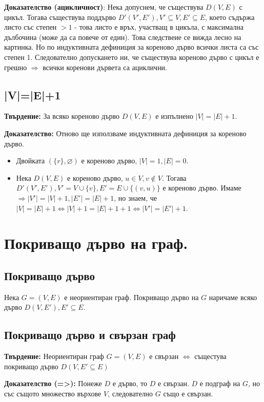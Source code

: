 \documentclass[fleqn,12pt]{article}
\begin{document}
\begin{flushleft}
\textbf{Доказателство (ацикличност)}: Нека допуснем, че съществува $D(V,E)$ с цикъл. Тогава съществува поддърво $D'(V', E'), V' \subseteq V, E' \subseteq E$, 
което съдържа листо със степен $>1$ - това листо е връх, участващ в цикъла, с максимална дълбочина (може да са повече от един). Това следствеие се вижда лесно на картинка. 
Но по индуктивната дефиниция за кореново дърво всички листа са със степен 1. Следователно допускането ни, че съществува кореново дърво с цикъл е грешно $\Rightarrow$ всички коренови дървета
са ациклични.
\vspace{10mm}

\subsection{|V|=|E|+1}
\textbf{Твърдение:} За всяко кореново дърво $D(V,E)$ е изпълнено $|V| = |E| + 1$.

\textbf{Доказателство:} Отново ще използваме индуктивната дефиниция за кореново дърво.
\begin{itemize}
	\item Двойката $(\{r\}, \varnothing)$ е кореново дърво, $|V| = 1, |E| = 0$.
	\item Нека $D(V,E)$ е кореново дърво, $u \in V, v \notin V$. Тогава $D'(V', E'), V' = V \cup \{v\}, E' = E \cup \{ (v, u)\}$ е кореново дърво.
	Имаме $\Rightarrow |V'| = |V| + 1, |E'| = |E| + 1$, но знаем, че $|V| = |E| + 1 \Leftrightarrow |V| + 1 = |E| + 1 + 1 \Leftrightarrow |V'| = |E'| + 1$.
\end{itemize}

\section{Покриващо дърво на граф.}
\subsection{Покриващо дърво}
Нека $G = (V, E)$ е неориентиран граф. Покриващо дърво на $G$ наричаме всяко дърво $D(V, E'), E' \subseteq E$.

\subsection{Покриващо дърво и свързан граф} 
\textbf{Твърдение:} Неориентиран граф $G = (V, E)$ е свързан $\Leftrightarrow $ същестува покриващо дърво $D(V, E' \subseteq E)$ 

\textbf{Доказателство (=>):} Понеже $D$ е дърво, то $D$ е свързан. $D$ е подграф на $G$, но със същото множество върхове $V$, следователно $G$ също е свързан.


\end{flushleft}
\end{document}

